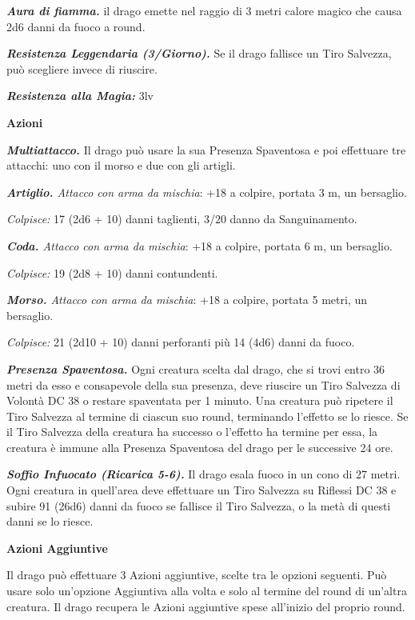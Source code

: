 \begin{multicols}{2}
{\emph{\textbf{Aura di fiamma.}} il drago emette nel raggio di 3 metri calore magico che causa 2d6 danni da fuoco a round.

\emph{\textbf{Resistenza Leggendaria (3/Giorno).}} Se il drago fallisce un Tiro Salvezza, può scegliere invece di riuscire.

\emph{\textbf{Resistenza alla Magia:}} 3lv

\textbf{Azioni}

\emph{\textbf{Multiattacco.}} Il drago può usare la sua Presenza Spaventosa e poi effettuare tre attacchi: uno con il morso e due con gli artigli.

\emph{\textbf{Artiglio.} Attacco con arma da mischia}: +18 a colpire, portata 3 m, un bersaglio.

\emph{Colpisce:} 17 (2d6 + 10) danni taglienti, 3/20 danno da Sanguinamento.

\emph{\textbf{Coda.} Attacco con arma da mischia}: +18 a colpire, portata 6 m, un bersaglio.

\emph{Colpisce:} 19 (2d8 + 10) danni contundenti.

\emph{\textbf{Morso.} Attacco con arma da mischia}: +18 a colpire, portata 5 metri, un bersaglio.

\emph{Colpisce:} 21 (2d10 + 10) danni perforanti più 14 (4d6) danni da fuoco.

\emph{\textbf{Presenza Spaventosa.}} Ogni creatura scelta dal drago, che si trovi entro 36 metri da esso e consapevole della sua presenza, deve riuscire un Tiro Salvezza di Volontà DC 38 o restare spaventata per 1 minuto. Una creatura può ripetere il Tiro Salvezza al termine di ciascun suo round, terminando l'effetto se lo riesce. Se il Tiro Salvezza della creatura ha successo o l'effetto ha termine per essa, la creatura è immune alla Presenza Spaventosa del drago per le successive 24 ore.

\emph{\textbf{Soffio Infuocato (Ricarica 5-6).}} Il drago esala fuoco in un cono di 27 metri. Ogni creatura in quell'area deve effettuare un Tiro Salvezza su Riflessi DC 38 e subire 91 (26d6) danni da fuoco se fallisce il Tiro Salvezza, o la metà di questi danni se lo riesce.

\textbf{Azioni Aggiuntive}

Il drago può effettuare 3 Azioni aggiuntive, scelte tra le opzioni seguenti. Può usare solo un'opzione Aggiuntiva alla volta e solo al termine del round di un'altra creatura. Il drago recupera le Azioni aggiuntive spese all'inizio del proprio round.

}
\end{multicols}
